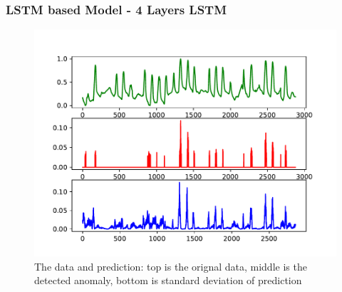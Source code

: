 \documentclass{beamer}
\begin{document}
\begin{frame}
\frametitle{LSTM based Model - 4 Layers LSTM}
\begin{figure}
\includegraphics[width=0.8\linewidth]{figs/lstm_dropout_test_h5_detect_4layer.pdf}
\vspace{-0.3in}
\caption{The data and prediction: top is the orignal data, middle is the detected anomaly, bottom is standard deviation of prediction}
\end{figure}
\end{frame}
\end{document}
